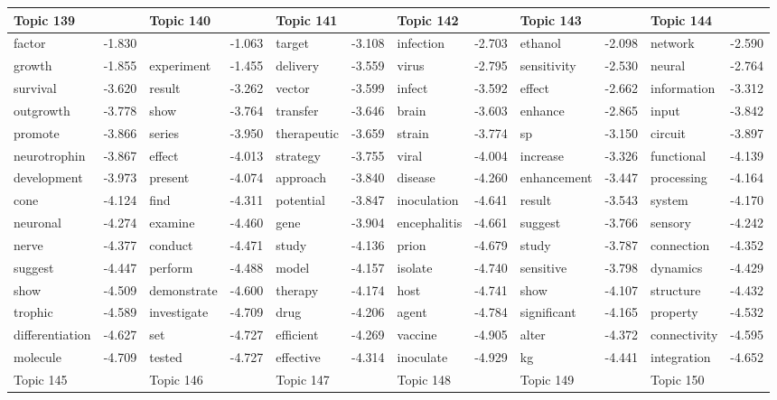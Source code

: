 \documentclass{article}
\begin{document}
\begin{table}
{\begin{tabular}{|l r|l r|l r|l r|l r|l r|}
\hline
\hline
Topic 139 & &Topic 140 & &Topic 141 & &Topic 142 & &Topic 143 & &Topic 144 &\\
\hline
factor & -1.830 &  & -1.063 & target & -3.108 & infection & -2.703 & ethanol & -2.098 & network & -2.590\\
growth & -1.855 & experiment & -1.455 & delivery & -3.559 & virus & -2.795 & sensitivity & -2.530 & neural & -2.764\\
survival & -3.620 & result & -3.262 & vector & -3.599 & infect & -3.592 & effect & -2.662 & information & -3.312\\
outgrowth & -3.778 & show & -3.764 & transfer & -3.646 & brain & -3.603 & enhance & -2.865 & input & -3.842\\
promote & -3.866 & series & -3.950 & therapeutic & -3.659 & strain & -3.774 & sp & -3.150 & circuit & -3.897\\
neurotrophin & -3.867 & effect & -4.013 & strategy & -3.755 & viral & -4.004 & increase & -3.326 & functional & -4.139\\
development & -3.973 & present & -4.074 & approach & -3.840 & disease & -4.260 & enhancement & -3.447 & processing & -4.164\\
cone & -4.124 & find & -4.311 & potential & -3.847 & inoculation & -4.641 & result & -3.543 & system & -4.170\\
neuronal & -4.274 & examine & -4.460 & gene & -3.904 & encephalitis & -4.661 & suggest & -3.766 & sensory & -4.242\\
nerve & -4.377 & conduct & -4.471 & study & -4.136 & prion & -4.679 & study & -3.787 & connection & -4.352\\
suggest & -4.447 & perform & -4.488 & model & -4.157 & isolate & -4.740 & sensitive & -3.798 & dynamics & -4.429\\
show & -4.509 & demonstrate & -4.600 & therapy & -4.174 & host & -4.741 & show & -4.107 & structure & -4.432\\
trophic & -4.589 & investigate & -4.709 & drug & -4.206 & agent & -4.784 & significant & -4.165 & property & -4.532\\
differentiation & -4.627 & set & -4.727 & efficient & -4.269 & vaccine & -4.905 & alter & -4.372 & connectivity & -4.595\\
molecule & -4.709 & tested & -4.727 & effective & -4.314 & inoculate & -4.929 & kg & -4.441 & integration & -4.652\\
\hline
\hline
Topic 145 & &Topic 146 & &Topic 147 & &Topic 148 & &Topic 149 & &Topic 150 &\\

\end{tabular}}
\end{table}
\end{document}
